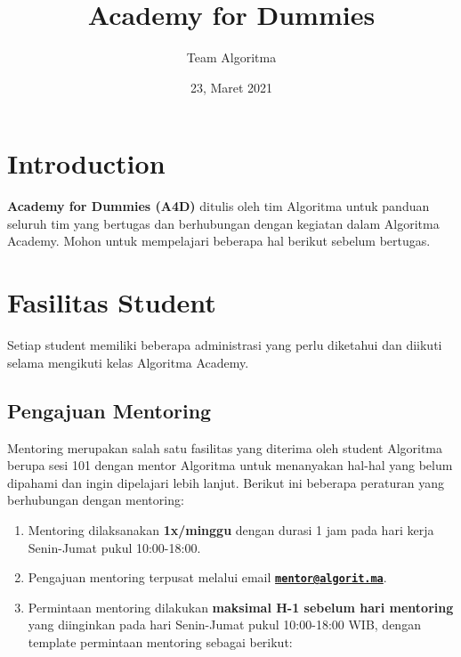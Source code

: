 \documentclass[
]{book}
\title{Academy for Dummies}
\author{Team Algoritma}
\date{23, Maret 2021}
\providecommand{\tightlist}{%
  \setlength{\itemsep}{0pt}\setlength{\parskip}{0pt}}
\begin{document}
\maketitle

{
\setcounter{tocdepth}{1}
\tableofcontents
}
\hypertarget{introduction}{%
\chapter{Introduction}\label{introduction}}

\textbf{Academy for Dummies (A4D)} ditulis oleh tim Algoritma untuk panduan seluruh tim yang bertugas dan berhubungan dengan kegiatan dalam Algoritma Academy. Mohon untuk mempelajari beberapa hal berikut sebelum bertugas.

\hypertarget{fasilitas-student}{%
\chapter{Fasilitas Student}\label{fasilitas-student}}

Setiap student memiliki beberapa administrasi yang perlu diketahui dan diikuti selama mengikuti kelas Algoritma Academy.

\hypertarget{pengajuan-mentoring}{%
\section{Pengajuan Mentoring}\label{pengajuan-mentoring}}

Mentoring merupakan salah satu fasilitas yang diterima oleh student Algoritma berupa sesi 101 dengan mentor Algoritma untuk menanyakan hal-hal yang belum dipahami dan ingin dipelajari lebih lanjut. Berikut ini beberapa peraturan yang berhubungan dengan mentoring:

\begin{enumerate}
\def\labelenumi{\arabic{enumi}.}
\tightlist
\item
  Mentoring dilaksanakan \textbf{1x/minggu} dengan durasi 1 jam pada hari kerja Senin-Jumat pukul 10:00-18:00.
\item
  Pengajuan mentoring terpusat melalui email \textbf{\href{mailto:mentor@algorit.ma}{\nolinkurl{mentor@algorit.ma}}}.
\item
  Permintaan mentoring dilakukan \textbf{maksimal H-1 sebelum hari mentoring} yang diinginkan pada hari Senin-Jumat pukul 10:00-18:00 WIB, dengan template permintaan mentoring sebagai berikut:
\end{enumerate}
\end{document}
